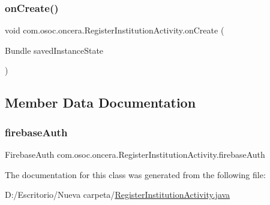 \subsubsection{\texorpdfstring{onCreate()}{onCreate()}}
{\footnotesize\ttfamily void com.\+osoc.\+oncera.\+Register\+Institution\+Activity.\+on\+Create (\begin{DoxyParamCaption}\item[{Bundle}]{saved\+Instance\+State }\end{DoxyParamCaption})\hspace{0.3cm}{\ttfamily [protected]}}



\subsection{Member Data Documentation}
\mbox{\label{classcom_1_1osoc_1_1oncera_1_1_register_institution_activity_acfd58196c3907e4b23d903bc0fcd57fc}} 
\subsubsection{\texorpdfstring{firebaseAuth}{firebaseAuth}}
{\footnotesize\ttfamily Firebase\+Auth com.\+osoc.\+oncera.\+Register\+Institution\+Activity.\+firebase\+Auth\hspace{0.3cm}{\ttfamily [static]}}



The documentation for this class was generated from the following file\+:\begin{DoxyCompactItemize}
\item 
D\+:/\+Escritorio/\+Nueva carpeta/\mbox{\hyperlink{_register_institution_activity_8java}{Register\+Institution\+Activity.\+java}}\end{DoxyCompactItemize}
